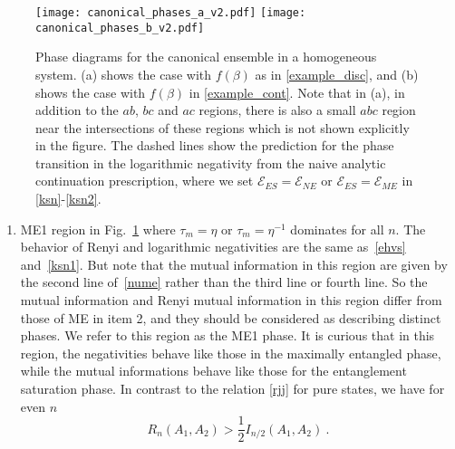 \documentclass[a4paper,11pt]{article}
\newcommand{\be}{\begin{equation}}
\newcommand{\ee}{\end{equation}}
\newcommand\lam{\lambda}
\newcommand\sE{{\ensuremath{{\mathcal E}}}}
\begin{document}
\begin{enumerate}
 
\begin{figure}[] 
\texttt{[image: canonical\_phases\_a\_v2.pdf]} \texttt{[image: canonical\_phases\_b\_v2.pdf]} 
\caption{Phase diagrams for the canonical ensemble in a homogeneous system. (a) shows the case with $f(\beta)$ as in \eqref{example_disc}, and (b) shows the case with $f(\beta)$ in \eqref{example_cont}. Note that in (a), in addition to the $ab$, $bc$ and $ac$ regions, there is also a small $abc$ region near the intersections of these regions which is not shown explicitly in the figure. The dashed lines show the prediction for the phase transition in the logarithmic negativity from the naive analytic continuation prescription, where we set $\sE_{ES}=\sE_{NE}$ or $\sE_{ES}=\sE_{ME}$ in \eqref{ksn}-\eqref{ksn2}.} 
\label{fig:phaD}
\end{figure} 
 
\begin{enumerate} 
\item ME1 region in Fig.~\ref{fig:phaD} where $\tau_m = \eta$ or $\tau_m = \eta^{-1}$ dominates for all $n$. The behavior of Renyi and logarithmic negativities are the same as~\eqref{ehvs} and~\eqref{ksn1}. But note that the mutual information in this region are given by the second line of~\eqref{nume} rather than the third line or fourth line. So the mutual information and Renyi mutual information in this region differ from those of ME in item 2, and they should be considered as describing distinct phases. We refer to this region as the ME1 phase.
It is curious that in this region, the negativities behave like those in the maximally entangled phase, while the mutual informations behave like those for the entanglement saturation phase. In contrast to the relation \eqref{rjj} for pure states, we have for even $n$ 
\be 
R_n (A_1, A_2) > \frac{1}{2} I_{n/2}(A_1, A_2) \ .
 \label{egi}
\ee



\end{enumerate}
\end{enumerate}
\end{document}
